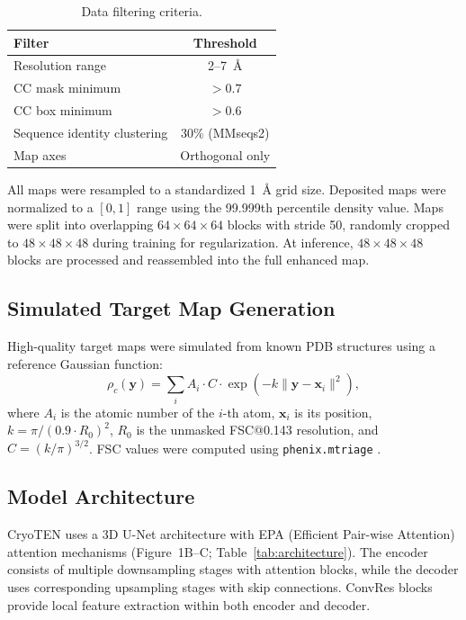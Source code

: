 \documentclass[11pt]{article}
\begin{document}
\begin{table}[H]
\centering
\caption{Data filtering criteria.}
\label{tab:filtering}
\begin{tabular}{lc}
\toprule
Filter & Threshold \\
\midrule
Resolution range & 2--7~\AA{} \\
CC mask minimum & $> 0.7$ \\
CC box minimum & $> 0.6$ \\
Sequence identity clustering & 30\% (MMseqs2) \\
Map axes & Orthogonal only \\
\bottomrule
\end{tabular}
\end{table}

All maps were resampled to a standardized 1~\AA{} grid size. Deposited maps were normalized to a $[0, 1]$ range using the 99.999th percentile density value. Maps were split into overlapping $64 \times 64 \times 64$ blocks with stride 50, randomly cropped to $48 \times 48 \times 48$ during training for regularization. At inference, $48 \times 48 \times 48$ blocks are processed and reassembled into the full enhanced map.

\subsection{Simulated Target Map Generation}

High-quality target maps were simulated from known PDB structures using a reference Gaussian function:
\begin{equation}
\rho_c(\mathbf{y}) = \sum_{i} A_i \cdot C \cdot \exp\left(-k \|\mathbf{y} - \mathbf{x}_i\|^2\right),
\end{equation}
where $A_i$ is the atomic number of the $i$-th atom, $\mathbf{x}_i$ is its position, $k = \pi / (0.9 \cdot R_0)^2$, $R_0$ is the unmasked FSC@0.143 resolution, and $C = (k/\pi)^{3/2}$. FSC values were computed using \texttt{phenix.mtriage} \citep{Afonine2018}.

\subsection{Model Architecture}

CryoTEN uses a 3D U-Net architecture with EPA (Efficient Pair-wise Attention) attention mechanisms (Figure~1B--C; Table~\ref{tab:architecture}). The encoder consists of multiple downsampling stages with attention blocks, while the decoder uses corresponding upsampling stages with skip connections. ConvRes blocks provide local feature extraction within both encoder and decoder.
\end{document}
